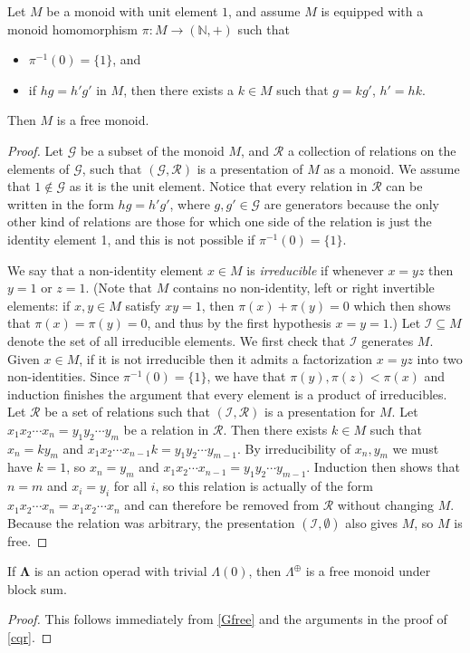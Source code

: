 \documentclass{amsbook} %
\newcommand{\ML}{\mathbf{\Lambda}}
\numberwithin{section}{chapter}
\begin{document}
\begin{prop}\label{Gfree}
Let $M$ be a monoid with unit element $1$, and assume $M$ is equipped with a monoid homomorphism $\pi \colon  M \to (\mathbb{N}, +)$ such that 
\begin{itemize}
\item $\pi^{-1}(0) = \{1\}$, and
\item if $hg = h' g'$ in $M$, then there exists a $k \in M$ such that $g = kg'$, $h' = hk$.
\end{itemize}
Then $M$ is a free monoid.
\end{prop}
\begin{proof}
Let $\mathcal{G}$ be a subset of the monoid $M$, and $\mathcal{R}$ a collection of relations on the elements of $\mathcal{G}$, such that $(\mathcal{G},\mathcal{R})$ is a presentation of $M$ as a monoid. We assume that $1 \notin \mathcal{G}$ as it is the unit element. Notice that every relation in $\mathcal{R}$ can be written in the form $h g = h' g'$, where $g,g' \in \mathcal{G}$ are generators because the only other kind of relations are those for which one side of the relation is just the identity element 1, and  this is not possible if $\pi^{-1}(0) = \{1\}$. 
 
We say that a non-identity element $x \in M$ is \emph{irreducible} if whenever $x = yz$ then $y=1$ or $z=1$. (Note that $M$ contains no non-identity, left or right invertible elements: if $x, y \in M$ satisfy $xy = 1$, then $\pi(x) + \pi(y) = 0$ which then shows that $\pi(x) = \pi(y) = 0$, and thus by the first hypothesis $x = y = 1$.) Let $\mathcal{I} \subseteq M$ denote the set of all irreducible elements. We first check that $\mathcal{I}$ generates $M$. Given $x \in M$, if it is not irreducible then it admits a factorization $x = yz$ into two non-identities. Since $\pi^{-1}(0) = \{1\}$, we have that $\pi(y), \pi(z) < \pi(x)$ and induction finishes the argument that every element is a product of irreducibles. Let $\mathcal{R}$ be a set of relations such that $(\mathcal{I}, \mathcal{R})$ is a presentation for $M$. Let $x_1 x_2 \cdots x_n = y_1 y_2 \cdots y_m$ be a relation in $\mathcal{R}$. Then there exists  $k \in M$ such that $x_n = k y_m$ and $x_1 x_2 \cdots x_{n-1} k = y_1 y_2 \cdots y_{m-1}$. By irreducibility of $x_n, y_m$ we must have $k=1$, so $x_n = y_m$ and $x_1 x_2 \cdots x_{n-1} = y_1 y_2 \cdots y_{m-1}$. Induction then shows that $n=m$ and $x_i = y_i$ for all $i$, so this relation is actually of the form $x_1 x_2 \cdots x_n =x_1 x_2 \cdots x_n$ and can therefore be removed from $\mathcal{R}$ without changing $M$. Because the relation was arbitrary, the presentation $(\mathcal{I}, \emptyset)$ also gives $M$, so $M$ is free.
\end{proof}
\begin{cor}\label{cor:ML_free}
If $\ML$ is an action operad with trivial $\Lambda(0)$, then $\Lambda^{\oplus}$ is a free monoid under block sum.
\end{cor}
\begin{proof}
This follows immediately from \cref{Gfree} and the arguments in the proof of \cref{cqr}.
\end{proof}
\end{document}
